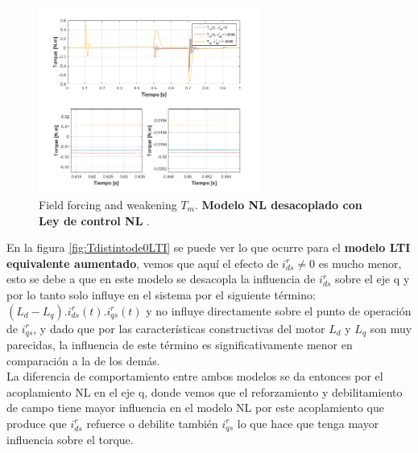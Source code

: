 \documentclass[10pt]{article}
\begin{document}
\begin{itemize}
	\begin{figure}[h!]
	\centering
	\includegraphics[width=0.65\textwidth]{Tdistintode0.png}
	\caption{\label{fig:Tdistintode0} Field forcing and weakening $T_{m}$. \textbf{Modelo NL desacoplado con Ley de control NL }.}
	\end{figure}
	
	En la figura \ref{fig:Tdistintode0LTI} se puede ver lo que ocurre para el \textbf{modelo LTI equivalente aumentado}, vemos que aquí el efecto de $i^{r}_{ds}\neq 0$ es mucho menor, esto se debe a que en este modelo se desacopla la influencia de $i^{r}_{ds}$ sobre el eje q y por lo tanto solo influye en el sistema por el siguiente término: $(L_{d}-L_{q}).i^{r}_{ds}(t).i^{r}_{qs}(t)$ y no influye directamente sobre el punto de operación de $i^{r}_{qs}$, y dado que por las características constructivas del motor $L_{d}$ y $L_{q}$ son muy parecidas, la influencia de este término es significativamente menor en comparación a la de los demás.\\
	La diferencia de comportamiento entre ambos modelos se da entonces por el acoplamiento NL en el eje q, donde vemos que el reforzamiento y debilitamiento de campo tiene mayor influencia en el modelo NL por este acoplamiento que produce que $i^{r}_{ds}$ refuerce o debilite también $i^{r}_{qs}$ lo que hace que tenga mayor influencia sobre el torque.\\
	

\end{itemize}
\end{document}
